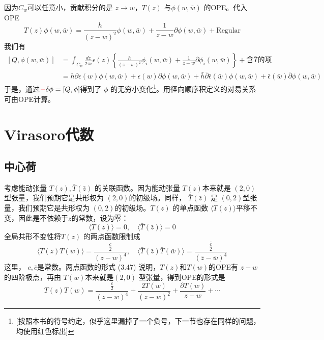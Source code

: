 因为$ C_w $可以任意小，贡献积分的是 $z\to w $，$T(z)$ 与$ \phi(w,\bar{w})$ 的OPE。代入OPE
\[
	T(z) \phi(w, \bar{w})=\frac{h}{(z-w)^{2}} \phi(w, \bar{w})+\frac{1}{z-w} \partial \phi(w, \bar{w})+\text{Regular}
\]
我们有
\begin{equation}
	\begin{aligned} \left[Q, \phi(w, \bar{w})\right]&=\int_{C_{w}} \frac{d z}{2 \pi i} \epsilon(z)\left\{\frac{h}{(z-w)^{2}} \phi_{i}(w, \bar{w})+\frac{1}{z-w} \partial \phi_{i}(w, \bar{w})\right\}+\text{含}\bar{T}\text{的项}\\ &=h \partial \epsilon(w) \phi(w, \bar{w})+\epsilon(w) \partial \phi(w, \bar{w})+\bar{h} \bar{\partial} \bar{\epsilon}(\bar{w}) \phi(w, \bar{w})+\bar{\epsilon}(\bar{w}) \bar{\partial} \phi(w, \bar{w}) \end{aligned}
\end{equation}
于是，通过$ {\color{red}-}\delta\phi=[Q,\phi] $得到了 $\phi$ 的无穷小变化\footnote{[按照本书的符号约定，似乎这里漏掉了一个负号，下一节也存在同样的问题，均使用红色标出]}。用径向顺序积定义的对易关系可由OPE计算。
\section{Virasoro代数}
\subsection{中心荷}
考虑能动张量 $T(z),\bar{T}(\bar{z})$ 的关联函数。因为能动张量 $T(z) $本来就是 $(2,0) $型张量，我们预期它是共形权为 $(2,0) $的初级场。同样， $\bar{T}(\bar{z})$ 是 $(0,2) $型张量，我们预期它是共形权为 $(0,2) $的初级场。$ T(z)$ 的单点函数 $\langle T(z)\rangle $平移不变，因此是不依赖于$ z$的常数，设为零：
\begin{equation}
	\langle T(z)\rangle=0, \quad\langle\bar{T}(\bar{z})\rangle=0
\end{equation}
全局共形不变性将$ T(z)$ 的两点函数限制成
\begin{equation}
	\langle T(z) T(w)\rangle=\frac{\frac{c}{2}}{(z-w)^{4}}, \quad\langle\bar{T}(\bar{z}) \bar{T}(\bar{w})\rangle=\frac{\frac{\bar{c}}{2}}{(\bar{z}-\bar{w})^{4}}
\end{equation}
这里， $c,\bar{c} $是常数。两点函数的形式 (3.47) 说明，$ T(z) $和$ T(w) $的OPE有 $z-w $的四阶极点，再由 $T(w) $本来就是$ (2,0)$ 型张量，得到OPE的形式是
\begin{equation}
	T(z) T(w)=\frac{\frac{c}{2}}{(z-w)^{4}}+\frac{2 T(w)}{(z-w)^{2}}+\frac{\partial T(w)}{z-w}+\cdots
\end{equation}

